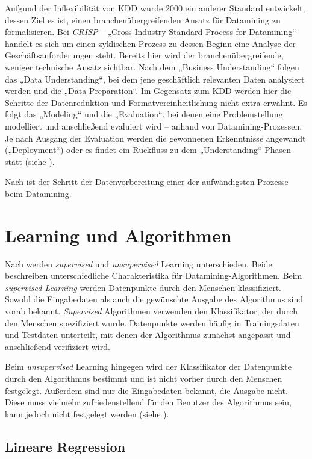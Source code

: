 Aufgund der Inflexibilität von KDD wurde 2000 ein anderer Standard entwickelt, dessen Ziel es ist, einen branchenübergreifenden Ansatz für Datamining zu formalisieren. Bei \textit{CRISP} -- „Cross Industry Standard Process for Datamining“\cite{crisp2000} handelt es sich um einen zyklischen Prozess zu dessen Beginn eine Analyse der Geschäftsanforderungen steht. Bereits hier wird der branchenübergreifende, weniger technische Ansatz sichtbar. Nach dem „Business Understanding“ folgen das „Data Understanding“, bei dem jene geschäftlich relevanten Daten analysiert werden und die „Data Preparation“. Im Gegensatz zum KDD werden hier die Schritte der Datenreduktion und Formatvereinheitlichung nicht extra erwähnt. Es folgt das „Modeling“ und die „Evaluation“, bei denen eine Problemstellung modelliert und anschließend evaluiert wird -- anhand von Datamining-Prozessen. Je nach Ausgang der Evaluation werden die gewonnenen Erkenntnisse angewandt („Deployment“) oder es findet ein Rückfluss zu dem „Understanding“ Phasen statt (siehe \cite{crisp2000}).

Nach \cite{pocket2014} ist der Schritt der Datenvorbereitung einer der aufwändigsten Prozesse beim Datamining.

\section{Learning und Algorithmen}

Nach \cite{datamining2011} werden \textit{supervised} und \textit{unsupervised} Learning unterschieden. Beide beschreiben unterschiedliche Charakteristika für Datamining-Algorithmen. Beim \textit{supervised Learning} werden Datenpunkte durch den Menschen klassifiziert. Sowohl die Eingabedaten als auch die gewünschte Ausgabe des Algorithmus sind vorab bekannt. \textit{Supervised} Algorithmen verwenden den Klassifikator, der durch den Menschen spezifiziert wurde. Datenpunkte werden häufig in Trainingsdaten und Testdaten unterteilt, mit denen der Algorithmus zunächst angepasst und anschließend verifiziert wird.

Beim \textit{unsupervised} Learning hingegen wird der Klassifikator der Datenpunkte durch den Algorithmus bestimmt und ist nicht vorher durch den Menschen festgelegt. Außerdem sind nur die Eingabedaten bekannt, die Ausgabe nicht. Diese muss vielmehr zufriedenstellend für den Benutzer des Algorithmus sein, kann jedoch nicht festgelegt werden (siehe \cite{datamining2011}).

\subsection {Lineare Regression}


